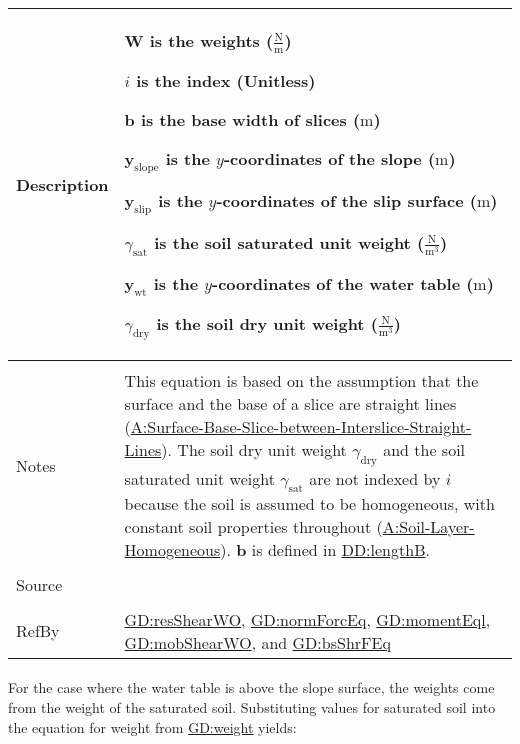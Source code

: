 \documentclass[12pt]{article}
\begin{document}
\begin{minipage}{\textwidth}
\begin{tabular}{>{\raggedright}p{}>{\raggedright\arraybackslash}p{}}
Description & \begin{symbDescription}
              \item{$\symbf{W}$ is the weights ($\frac{\text{N}}{\text{m}}$)}
              \item{$i$ is the index (Unitless)}
              \item{$\symbf{b}$ is the base width of slices (${\text{m}}$)}
              \item{${\symbf{y}_{\text{slope}}}$ is the $y$-coordinates of the slope (${\text{m}}$)}
              \item{${\symbf{y}_{\text{slip}}}$ is the $y$-coordinates of the slip surface (${\text{m}}$)}
              \item{${γ_{\text{sat}}}$ is the soil saturated unit weight ($\frac{\text{N}}{\text{m}^{3}}$)}
              \item{${\symbf{y}_{\text{wt}}}$ is the $y$-coordinates of the water table (${\text{m}}$)}
              \item{${γ_{\text{dry}}}$ is the soil dry unit weight ($\frac{\text{N}}{\text{m}^{3}}$)}
              \end{symbDescription}
\\ \midrule \\
Notes & This equation is based on the assumption that the surface and the base of a slice are straight lines (\hyperref[assumpSBSBISL]{A:Surface-Base-Slice-between-Interslice-Straight-Lines}). The soil dry unit weight ${γ_{\text{dry}}}$ and the soil saturated unit weight ${γ_{\text{sat}}}$ are not indexed by $i$ because the soil is assumed to be homogeneous, with constant soil properties throughout (\hyperref[assumpSLH]{A:Soil-Layer-Homogeneous}). $\symbf{b}$ is defined in \hyperref[DD:lengthB]{DD:lengthB}.
        
\\ \midrule \\
Source & \cite{fredlund1977}
         
\\ \midrule \\
RefBy & \hyperref[GD:resShearWO]{GD:resShearWO}, \hyperref[GD:normForcEq]{GD:normForcEq}, \hyperref[GD:momentEql]{GD:momentEql}, \hyperref[GD:mobShearWO]{GD:mobShearWO}, and \hyperref[GD:bsShrFEq]{GD:bsShrFEq}
        
\\ \bottomrule
\end{tabular}
\end{minipage}
\paragraph{}
\label{GD:sliceWghtDeriv}
For the case where the water table is above the slope surface, the weights come from the weight of the saturated soil. Substituting values for saturated soil into the equation for weight from \hyperref[GD:weight]{GD:weight} yields:
\end{document}
